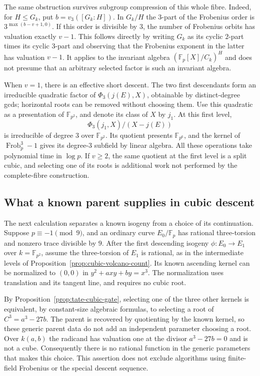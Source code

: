 \documentclass[11pt]{article}
\theoremstyle{definition}
\theoremstyle{remark}
\begin{document}
The same obstruction survives subgroup compression of this
whole fibre.  Indeed, for $H\le G_k$, put
$b=v_3([G_k:H])$.  In $G_k/H$ the $3$-part of the Frobenius
order is $3^{\max(b-v+1,0)}$.  If this order is divisible
by $3$, the number of Frobenius orbits has valuation exactly
$v-1$.  This follows directly by writing $G_k$ as its cyclic
$2$-part times its cyclic $3$-part and observing that the
Frobenius exponent in the latter has valuation $v-1$.
It applies to the invariant algebra
$(\mathbb F_p[X]/C_k)^H$ and does not presume that an
arbitrary selected factor is such an invariant algebra.

When $v=1$, there is an effective short descent.
The two first descendants form an irreducible quadratic
factor of $\Phi_3(j(E),X)$, obtainable by distinct-degree
gcds; horizontal roots can be removed without choosing them.
Use this quadratic as a presentation of $\mathbb F_{p^2}$,
and denote its class of $X$ by $j_1$.  At this first level,
\[
 \Phi_3(j_1,X)/(X-j(E))
\]
is irreducible of degree $3$ over $\mathbb F_{p^2}$.
Its quotient presents $\mathbb F_{p^6}$, and the kernel of
$\operatorname{Frob}_p^3-1$ gives its degree-$3$ subfield by
linear algebra.  All these operations take polynomial time
in $\log p$.  If $v\ge2$, the same quotient at the first
level is a split cubic, and selecting one of its roots is
additional work not performed by the complete-fibre construction.

\subsection{What a known parent supplies in cubic descent}
\label{sec:cubic-parent-choice}
The next calculation separates a known isogeny from a choice of its
continuation.  Suppose $p\equiv-1\pmod9$, and an ordinary curve
$E_0/\mathbb F_p$ has rational three-torsion and nonzero trace divisible
by $9$.  After the first descending isogeny
$\phi:E_0\longrightarrow E_1$ over $k=\mathbb F_{p^2}$, assume the
three-torsion of $E_1$ is rational, as in the intermediate levels of
Proposition~\ref{prop:cubic-volcano-count}.  Its known ascending kernel
can be normalized to $(0,0)$ in
$y^2+axy+by=x^3$.  The normalization uses translation and its tangent
line, and requires no cubic root.

By Proposition~\ref{prop:tate-cubic-gate}, selecting one of the three
other kernels is equivalent, by constant-size algebraic formulas, to
selecting a root of $C^3=a^3-27b$.  The parent is recovered by quotienting
by the known kernel, so these generic parent data do not add an
independent parameter choosing a root.  Over $k(a,b)$ the radicand has
valuation one at the divisor $a^3-27b=0$ and is not a cube.  Consequently
there is no rational function in the generic parameters that makes this
choice.  This assertion does not exclude algorithms using finite-field
Frobenius or the special descent sequence.
\end{document}
